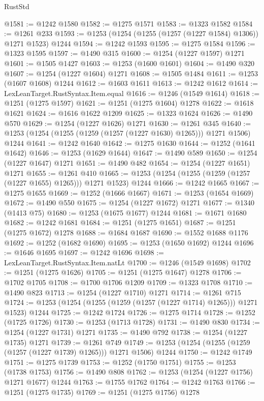 \begin{lexlean}{RustStd}
\begin{coremodule}
@1581 := @1242 @1580
@1582 := @1275 @1571
@1583 := @1323 @1582
@1584 := @1261 @233
@1593 := @1253 (@1254 (@1255 (@1257 (@1227 @1584) @1306)) @1271 @1523) @1244
@1594 := @1242 @1593
@1595 := @1275 @1584
@1596 := @1323 @1595
@1597 := @1490 @315
@1600 := @1254 (@1227 @1597) @1271
@1601 := @1505 @1427
@1603 := @1253 (@1600 @1601)
@1604 := @1490 @320
@1607 := @1254 (@1227 @1604) @1271
@1608 := @1505 @1484
@1611 := @1253 (@1607 @1608) @1244
@1612 := @1603 @1611
@1613 := @1242 @1612
@1614 := LexLeanTarget.RustSyntax.Item.equal
@1616 := @1246 (@1549 @1614)
@1618 := @1251 (@1275 @1597)
@1621 := @1251 (@1275 @1604) @1278
@1622 := @1618 @1621
@1624 := @1616 @1622 @1209
@1625 := @1323 @1624
@1626 := @1490 @570
@1629 := @1254 (@1227 @1626) @1271
@1630 := @1261 @345
@1640 := @1253 (@1254 (@1255 (@1259 (@1257 (@1227 @1630) @1265))) @1271 @1506) @1244
@1641 := @1242 @1640
@1642 := @1275 @1630
@1644 := @1252 (@1641 @1642)
@1646 := @1253 (@1629 @1644)
@1647 := @1490 @589
@1650 := @1254 (@1227 @1647) @1271
@1651 := @1490 @482
@1654 := @1254 (@1227 @1651) @1271
@1655 := @1261 @410
@1665 := @1253 (@1254 (@1255 (@1259 (@1257 (@1227 @1655) @1265))) @1271 @1523) @1244
@1666 := @1242 @1665
@1667 := @1275 @1655
@1669 := @1252 (@1666 @1667)
@1671 := @1253 (@1654 @1669)
@1672 := @1490 @550
@1675 := @1254 (@1227 @1672) @1271
@1677 := @1340 (@1413 @75)
@1680 := @1253 (@1675 @1677) @1244
@1681 := @1671 @1680
@1682 := @1242 @1681
@1684 := @1251 (@1275 @1651)
@1687 := @1251 (@1275 @1672) @1278
@1688 := @1684 @1687
@1690 := @1552 @1688 @1176
@1692 := @1252 (@1682 @1690)
@1695 := @1253 (@1650 @1692) @1244
@1696 := @1646 @1695
@1697 := @1242 @1696
@1698 := LexLeanTarget.RustSyntax.Item.natLt
@1700 := @1246 (@1549 @1698)
@1702 := @1251 (@1275 @1626)
@1705 := @1251 (@1275 @1647) @1278
@1706 := @1702 @1705
@1708 := @1700 @1706 @1209
@1709 := @1323 @1708
@1710 := @1490 @823
@1713 := @1254 (@1227 @1710) @1271
@1714 := @1261 @715
@1724 := @1253 (@1254 (@1255 (@1259 (@1257 (@1227 @1714) @1265))) @1271 @1523) @1244
@1725 := @1242 @1724
@1726 := @1275 @1714
@1728 := @1252 (@1725 @1726)
@1730 := @1253 (@1713 @1728)
@1731 := @1490 @830
@1734 := @1254 (@1227 @1731) @1271
@1735 := @1490 @792
@1738 := @1254 (@1227 @1735) @1271
@1739 := @1261 @749
@1749 := @1253 (@1254 (@1255 (@1259 (@1257 (@1227 @1739) @1265))) @1271 @1506) @1244
@1750 := @1242 @1749
@1751 := @1275 @1739
@1753 := @1252 (@1750 @1751)
@1755 := @1253 (@1738 @1753)
@1756 := @1490 @808
@1762 := @1253 (@1254 (@1227 @1756) @1271 @1677) @1244
@1763 := @1755 @1762
@1764 := @1242 @1763
@1766 := @1251 (@1275 @1735)
@1769 := @1251 (@1275 @1756) @1278

\end{coremodule}
\end{lexlean}
